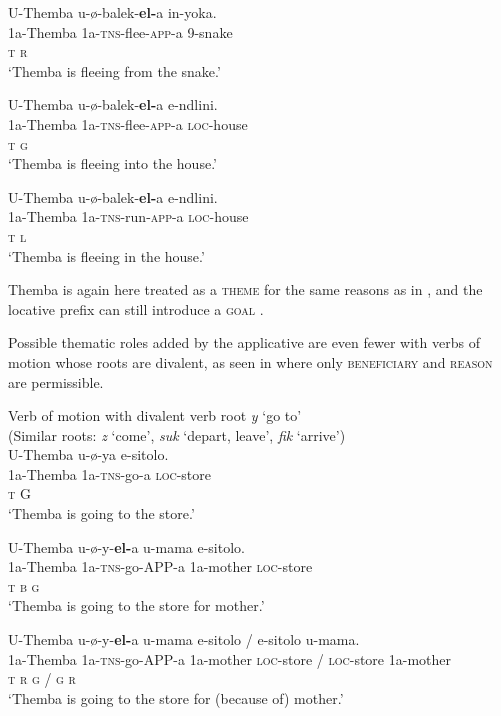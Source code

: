 \documentclass[output=paper]{langsci/langscibook}
\begin{document}
\ex
\gll U-Themba u-ø-balek-\textbf{el-}a in-yoka. \\
 1a-Themba 1a-\textsc{tns}-flee-\textsc{app}-a 9-snake\\
 \textsc{t r}\\
\glt ‘Themba is fleeing from the snake.’ 

\ex
\gll U-Themba u-ø-balek-\textbf{el-}a e-ndlini. \\
 1a-Themba 1a-\textsc{tns}-flee-\textsc{app}-a \textsc{loc}-house\\
 \textsc{t g}\\
\glt ‘Themba is fleeing into the house.’

\ex
\gll U-Themba u-ø-balek-\textbf{el-}a e-ndlini. \\
 1a-Themba 1a-\textsc{tns}-run-\textsc{app}-a \textsc{loc}-house\\
 \textsc{t l}\\
\glt ‘Themba is fleeing in the house.’
\z
\z

Themba is again here treated as a \textsc{theme} for the same reasons as in , and the locative prefix can still introduce a \textsc{goal }.

 Possible thematic roles added by the applicative are even fewer with verbs of motion whose roots are divalent, as seen in  where only \textsc{beneficiary} and \textsc{reason} are permissible. 

\ea
{Verb of motion with divalent verb root \textit{y }‘go to’ }\\
 (Similar roots: \textit{z} ‘come’, \textit{suk} ‘depart, leave’, \textit{fik} ‘arrive’)\\
\ea
\gll U-Themba u-ø-ya e-sitolo. \\
 1a-Themba 1a-\textsc{tns}-go-a \textsc{loc}-store\\
 \textsc{t }G\\
\glt ‘Themba is going to the store.’

\ex
\gll U-Themba u-ø-y-\textbf{el-}a{\rmfnm} u-mama e-sitolo. \\
 1a-Themba 1a-\textsc{tns}-go-APP-a 1a-mother \textsc{loc}-store\\
 \textsc{t b g}\\
\glt ‘Themba is going to the store for mother.’

\ex
\gll U-Themba u-ø-y-\textbf{el-}a u-mama e-sitolo / e-sitolo u-mama.\\
 1a-Themba 1a-\textsc{tns}-go-APP-a 1a-mother \textsc{loc}-store / \textsc{loc}-store 1a-mother\\
 \textsc{t r g / g r}\\
\glt ‘Themba is going to the store for (because of) mother.’
\end{document}
